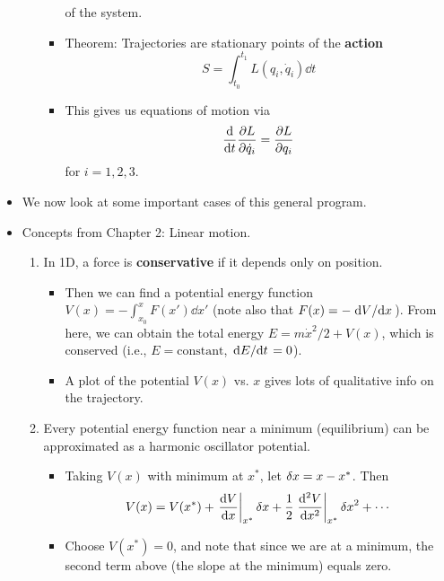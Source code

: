 \documentclass[../notes.tex]{subfiles}
\begin{document}
\begin{itemize}
\begin{enumerate}
\begin{itemize}
\begin{equation*}
            \end{equation*}
            of the system.
            \item Theorem: Trajectories are stationary points of the \textbf{action}
            \begin{equation*}
                S = \int_{t_0}^{t_1}L(q_i,\dot{q}_i)\dd{t}
            \end{equation*}
            \item This gives us equations of motion via
            \begin{equation*}
                \dv{t}\pdv{L}{\dot{q}_i} = \pdv{L}{q_i}
            \end{equation*}
            for $i=1,2,3$.
        \end{itemize}
    \end{enumerate}
    \item We now look at some important cases of this general program.
    \item Concepts from Chapter 2: Linear motion.
    \begin{enumerate}
        \item In 1D, a force is \textbf{conservative} if it depends only on position.
        \begin{itemize}
            \item Then we can find a potential energy function $V(x)=-\int_{x_0}^xF(x')\dd{x'}$ (note also that $F(x)=-\dv*{V}{x}$). From here, we can obtain the total energy $E=m\dot{x}^2/2+V(x)$, which is conserved (i.e., $E=\text{constant}$, $\dv*{E}{t}=0$).
            \item A plot of the potential $V(x)$ vs. $x$ gives lots of qualitative info on the trajectory.
        \end{itemize}
        \item Every potential energy function near a minimum (equilibrium) can be approximated as a harmonic oscillator potential.
        \begin{itemize}
            \item Taking $V(x)$ with minimum at $x^*$, let $\var{x}=x-x^*$. Then
            \begin{equation*}
                V(x) = V(x^*)+\eval{\dv{V}{x}}_{x^*}\var{x}+\frac{1}{2}\eval{\dv[2]{V}{x}}_{x^*}\var{x}^2+\cdots
            \end{equation*}
            \item Choose $V(x^*)=0$, and note that since we are at a minimum, the second term above (the slope at the minimum) equals zero.

\end{itemize}
\end{enumerate}
\end{itemize}
\end{document}
